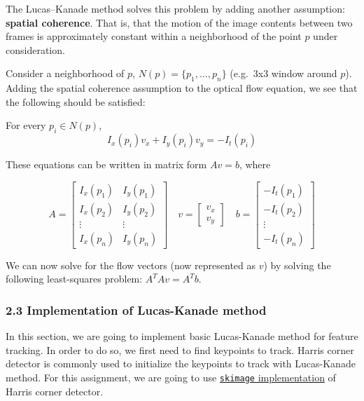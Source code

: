 \documentclass[11pt]{article}
\begin{document}
The Lucas--Kanade method solves this problem by adding another
assumption: \textbf{spatial coherence}. That is, that the motion of the
image contents between two frames is approximately constant within a
neighborhood of the point \(p\) under consideration.

Consider a neighborhood of \(p\), \(N(p)=\{p_1,...,p_n\}\) (e.g.~3x3
window around \(p\)). Adding the spatial coherence assumption to the
optical flow equation, we see that the following should be satisfied:

For every \(p_i \in N(p)\), \[
I_{x}(p_i)v_x + I_{y}(p_i)v_y = -I_{t}(p_i)
\]

These equations can be written in matrix form \(Av=b\), where

\[
A = 
\begin{bmatrix}
    I_{x}(p_1) & I_{y}(p_1)\\
    I_{x}(p_2) & I_{y}(p_2)\\
    \vdots & \vdots\\
    I_{x}(p_n) & I_{y}(p_n)
\end{bmatrix}
\quad
v =
\begin{bmatrix}
    v_{x}\\
    v_{y}
\end{bmatrix}
\quad
b =
\begin{bmatrix}
    -I_{t}(p_1)\\
    -I_{t}(p_2)\\
    \vdots\\
    -I_{t}(p_n)
\end{bmatrix}
\]

We can now solve for the flow vectors (now represented as \(v\)) by
solving the following least-squares problem: \(A^{T}Av=A^{T}b\).

    \hypertarget{implementation-of-lucas-kanade-method}{%
\subsubsection{2.3 Implementation of Lucas-Kanade
method}\label{implementation-of-lucas-kanade-method}}

In this section, we are going to implement basic Lucas-Kanade method for
feature tracking. In order to do so, we first need to find keypoints to
track. Harris corner detector is commonly used to initialize the
keypoints to track with Lucas-Kanade method. For this assignment, we are
going to use
\href{http://scikit-image.org/docs/dev/auto_examples/features_detection/plot_corner.html}{\texttt{skimage}
implementation} of Harris corner detector.
\end{document}
